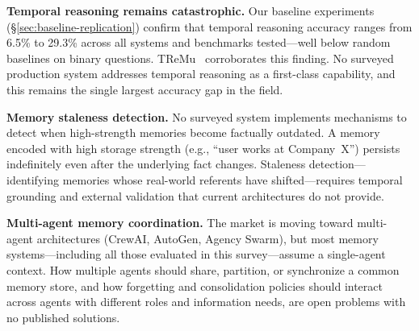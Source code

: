 \textbf{Temporal reasoning remains catastrophic.} Our baseline
experiments (\S\ref{sec:baseline-replication}) confirm that temporal
reasoning accuracy ranges from 6.5\% to 29.3\% across all systems and
benchmarks tested---well below random baselines on binary questions.
TReMu~\cite{ge2025tremu} corroborates this finding. No surveyed
production system addresses temporal reasoning as a first-class
capability, and this remains the single largest accuracy gap in the
field.

\textbf{Memory staleness detection.} No surveyed system implements
mechanisms to detect when high-strength memories become factually
outdated. A memory encoded with high storage strength (e.g., ``user
works at Company~X'') persists indefinitely even after the underlying
fact changes. Staleness detection---identifying memories whose
real-world referents have shifted---requires temporal grounding and
external validation that current architectures do not provide.

\textbf{Multi-agent memory coordination.} The market is moving toward
multi-agent architectures (CrewAI, AutoGen, Agency Swarm), but most
memory systems---including all those evaluated in this survey---assume a
single-agent context. How multiple agents should share, partition, or
synchronize a common memory store, and how forgetting and consolidation
policies should interact across agents with different roles and
information needs, are open problems with no published solutions.
